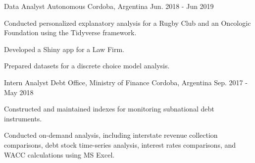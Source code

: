 \begin{cventries}
  \cventry
    {Data Analyst} %
    {Autonomous} %
    {Cordoba, Argentina} %
	{Jun. 2018 - Jun 2019} %
    {
      \begin{cvitems} %
   	\item {Conducted personalized explanatory analysis for a Rugby Club and an Oncologic Foundation using the Tidyverse framework.}
	\item {Developed a Shiny app for a Law Firm.}
	\item {Prepared datasets for a discrete choice model analysis.}
      \end{cvitems}
    }

    
  \cventry
    {Intern Analyst} %
    {Debt Office, Ministry of Finance} %
    {Cordoba, Argentina} %
    {Sep. 2017 - May 2018} %
    {
      \begin{cvitems} %
      \item {Constructed and maintained indexes for monitoring subnational debt instruments.}
      \item {Conducted on-demand analysis, including interstate revenue collection comparisons, debt stock time-series analysis, interest rates comparisons, and WACC calculations using MS Excel.}
      \end{cvitems}
    }



\end{cventries}
